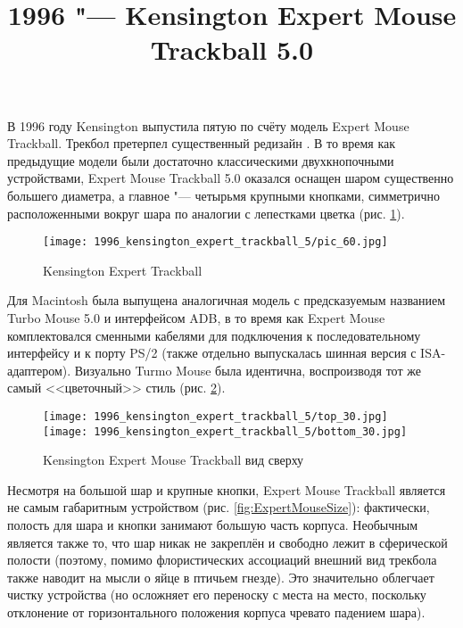 \documentclass[11pt, a4paper]{article}
\begin{document}
\title{1996 "--- Kensington Expert Mouse Trackball 5.0}
\date{}
\maketitle

В 1996 году Kensington выпустила пятую по счёту модель Expert Mouse Trackball. Трекбол претерпел существенный редизайн \cite{KensingtonPC}. В то время как предыдущие модели были достаточно классическими двухкнопочными устройствами, Expert Mouse Trackball 5.0 оказался оснащен шаром существенно большего диаметра, а главное "---  четырьмя крупными кнопками, симметрично расположенными вокруг шара по аналогии с лепестками цветка (рис. \ref{fig:ExpertMousePic}).

\begin{figure}[h]
    \centering
    \texttt{[image: 1996\_kensington\_expert\_trackball\_5/pic\_60.jpg]}
    \caption{Kensington Expert Trackball}
    \label{fig:ExpertMousePic}
\end{figure}

Для Macintosh была выпущена аналогичная модель с предсказуемым названием Turbo Mouse 5.0 \cite{KensingtonMac} и интерфейсом ADB, в то время как Expert Mouse комплектовался сменными кабелями для подключения к последовательному интерфейсу и к порту PS/2 (также отдельно выпускалась шинная версия с ISA-адаптером). Визуально Turmo Mouse была идентична, воспроизводя тот же самый <<цветочный>> стиль (рис. \ref{fig:ExpertMouseTopBottom}).

\begin{figure}[h]
    \centering
    \texttt{[image: 1996\_kensington\_expert\_trackball\_5/top\_30.jpg]}
    \texttt{[image: 1996\_kensington\_expert\_trackball\_5/bottom\_30.jpg]}
    \caption{Kensington Expert Mouse Trackball вид сверху}
    \label{fig:ExpertMouseTopBottom}
\end{figure}

Несмотря на большой шар и крупные кнопки, Expert Mouse Trackball является не самым габаритным устройством (рис. \ref{fig:ExpertMouseSize}): фактически, полость для шара и кнопки занимают большую часть корпуса. Необычным является также то, что шар никак не закреплён и свободно лежит в сферической полости (поэтому, помимо флористических ассоциаций внешний вид трекбола также наводит на мысли о яйце в птичьем гнезде). Это значительно облегчает чистку устройства (но осложняет его переноску с места на место, поскольку  отклонение от горизонтального положения корпуса чревато падением шара).
\end{document}
